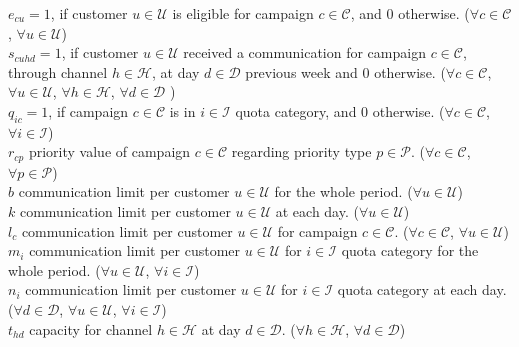 \documentclass[11pt]{article}
\begin{document}
\noindent $e_{{c}{u}}=1$, if customer $u \in \mathcal{U}$ is eligible for campaign $c \in \mathcal{C}$, and 0 otherwise.
($\forall c \in \mathcal{C}$, $\forall u \in \mathcal{U}$)\\

\noindent $s_{{c}{u}{h}{d}}=1$, if customer $u \in \mathcal{U}$ received a communication for campaign $c \in \mathcal{C}$, through channel $h \in \mathcal{H}$, at day $d \in \mathcal{D}$ previous week and 0 otherwise.
($\forall c \in \mathcal{C}$, $\forall u \in \mathcal{U}$, $\forall h \in \mathcal{H}$, $\forall d \in \mathcal{D}$ )\\

\noindent $q_{{i}{c}}=1$, if campaign $c \in \mathcal{C}$ is in $i \in \mathcal{I}$ quota category, and 0 otherwise.
($\forall c \in \mathcal{C}$, $\forall i \in \mathcal{I}$)\\

\noindent $r_{{c}{p}}$ priority value of campaign $c \in \mathcal{C}$ regarding priority type $p \in \mathcal{P}$.
($\forall c \in \mathcal{C}$, $\forall p \in \mathcal{P}$)\\

\noindent $b$ communication limit per customer $u \in \mathcal{U}$ for the whole period.
($\forall u \in \mathcal{U}$)\\

\noindent $k$ communication limit per customer $u \in \mathcal{U}$ at each day.
($\forall u \in \mathcal{U}$)\\

\noindent $l_{c}$ communication limit per customer $u \in \mathcal{U}$ for campaign $c \in \mathcal{C}$.
($\forall c \in \mathcal{C}$, $\forall u \in \mathcal{U}$)\\

\noindent $m_{i}$ communication limit per customer $u \in \mathcal{U}$ for $i \in \mathcal{I}$ quota category for the whole period.
($\forall u \in \mathcal{U}$, $\forall i \in \mathcal{I}$)\\

\noindent $n_{i}$ communication limit per customer $u \in \mathcal{U}$ for $i \in \mathcal{I}$ quota category at each day.
($\forall d \in \mathcal{D}$, $\forall u \in \mathcal{U}$, $\forall i \in \mathcal{I}$)\\

\noindent $t_{{h}{d}}$ capacity for channel $h \in \mathcal{H}$ at day $d \in \mathcal{D}$.
($\forall h \in \mathcal{H}$, $\forall d \in \mathcal{D}$)\\
\end{document}
